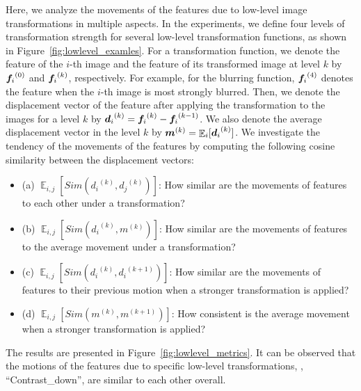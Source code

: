 Here, we analyze the movements of the features due to low-level image transformations in multiple aspects.
In the experiments, we define four levels of transformation strength for several low-level transformation functions, as shown in  Figure~\ref{fig:lowlevel_examles}.
For a transformation function, we denote the feature of the $i$-th image and the feature of its transformed image at level $k$ by ${\bm{f}_i}^{(0)}$ and ${\bm{f}_i}^{(k)}$, respectively.
For example, for the blurring function, ${\bm{f}_i}^{(4)}$ denotes the feature when the $i$-th image is most strongly blurred.
Then, we denote the displacement vector of the feature after applying the transformation to the images for a level $k$ by ${\bm{d}_i}^{(k)} = {\bm{f}_i}^{(k)} - {\bm{f}_i}^{(k-1)}$.
We also denote the average displacement vector in the level $k$ by ${\bm{m}}^{(k)} = \mathop{\mathbb{E}}_{i} [{\bm{d}_i}^{(k)}]$.
We investigate the tendency of the movements of the features by computing the following cosine similarity between the displacement vectors:
\begin{itemize}
    \item (a) $\mathop{\mathbb{E}}_{i,j} [Sim({d_i}^{(k)}, {d_j}^{(k)})]$: 
    How similar are the movements of features to each other under a transformation?
    \item (b) $\mathop{\mathbb{E}}_{i,j} [Sim({d_i}^{(k)}, {m}^{(k)})]$:
    How similar are the movements of features to the average movement under a transformation?
    \item (c) $\mathop{\mathbb{E}}_{i,j} [Sim({d_i}^{(k)}, {d_i}^{(k+1)})]$:
    How similar are the movements of features to their previous motion when a stronger transformation is applied?
    \item (d) $\mathop{\mathbb{E}}_{i,j} [Sim({m}^{(k)}, {m}^{(k+1)})]$:
    How consistent is the average movement when a stronger transformation is applied?
\end{itemize}
The results are presented in Figure~\ref{fig:lowlevel_metrics}.
It can be observed that the motions of the features due to specific low-level transformations, \eg, ``Contrast\_down'', are similar to each other overall.






